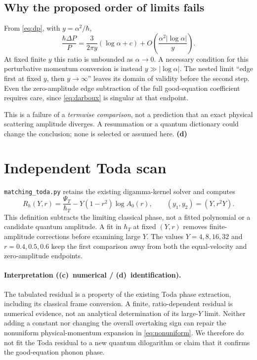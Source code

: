 \documentclass[11pt,a4paper]{article}
\newcommand{\Lc}{\textsf{\textbf{(c)}}}
\newcommand{\Ld}{\textsf{\textbf{(d)}}}
\newcommand{\scr}[1]{\texttt{matching\_#1.py}}
\begin{document}
\subsection{Why the proposed order of limits fails}
From \eqref{eq:dp}, with $y=\alpha^2/\hbar$,
\begin{equation}
 \frac{\hbar\Delta P}{P}
 =\frac{3}{2\pi y}(\log\alpha+c)
 +O\!\left(\frac{\alpha^2|\log\alpha|}{y}\right).\label{eq:nonuniform}
\end{equation}
At fixed finite $y$ this ratio is unbounded as $\alpha\to0$. A necessary
condition for this perturbative momentum conversion is instead
$y\gg|\log\alpha|$. The nested limit ``edge first at fixed $y$, then
$y\to\infty$'' leaves its domain of validity before the second step.
Even the zero-amplitude edge subtraction of the full good-equation coefficient
requires care, since \eqref{eq:darboux} is singular at that endpoint.

This is a failure of a \emph{termwise comparison}, not a prediction that an
exact physical scattering amplitude diverges. A resummation or a quantum
dictionary could change the conclusion; none is selected or assumed here. \Ld

\section{Independent Toda scan}
\scr{toda} retains the existing digamma-kernel solver and computes
\begin{equation}
 R_h(Y,r)=\frac{\Psi_T}{\hbar_T}
 -Y(1-r^2)\log A_0(r),\qquad (y_1,y_2)=(Y,r^2Y).
\end{equation}
This definition subtracts the limiting classical phase, not a fitted
polynomial or a candidate quantum amplitude. A fit in $\hbar_T$ at fixed
$(Y,r)$ removes finite-amplitude corrections before examining large $Y$.
The values $Y=4,8,16,32$ and $r=0.4,0.5,0.6$ keep the first comparison
away from both the equal-velocity and zero-amplitude endpoints.



\paragraph{Interpretation (\Lc\ numerical / \Ld\ identification).}
The tabulated residual is a property of the existing Toda phase extraction,
including its classical frame conversion. A finite, ratio-dependent residual
is numerical evidence, not an analytical determination of its large-$Y$
limit. Neither adding a constant nor changing the overall overtaking sign
can repair the nonuniform physical-momentum expansion in
\eqref{eq:nonuniform}. We therefore do not fit the Toda residual to a new
quantum dilogarithm or claim that it confirms the good-equation phonon phase.
\end{document}
